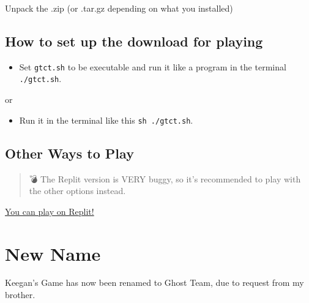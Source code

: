\documentclass[11pt]{article}
\begin{document}
Unpack the .zip (or .tar.gz depending on what you installed)
\subsection{How to set up the download for playing}
\label{sec:orgb2552db}
\begin{itemize}
\item Set \texttt{gtct.sh} to be executable and run it like a program in the terminal \texttt{./gtct.sh}.
\end{itemize}

or

\begin{itemize}
\item Run it in the terminal like this \texttt{sh ./gtct.sh}.
\end{itemize}
\subsection{Other Ways to Play}
\label{sec:org0d2cc0e}
\begin{quote}
💣 The Replit version is VERY buggy, so it's recommended to play with the other options instead.
\end{quote}
\href{https://replit.com/@Kamboy123/gt-computer-trouble?v=1}{You can play on Replit!}
\section{New Name}
\label{sec:org77f73e2}
Keegan's Game has now been renamed to Ghost Team, due to request from my brother.
\end{document}
